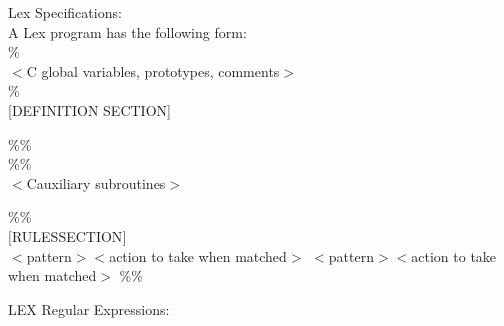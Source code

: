 \documentclass[11pt]{article}
\begin{document}
	\noindent
	Lex Specifications:\\
	A Lex program has the following form:\\
	
	\%{\\
		$<$C global variables, prototypes, comments$>$\\
		\%}\\
	
	[DEFINITION SECTION]
	
	\%\%\\
	
	\%\%\\
	
	$<$Cauxiliary  subroutines$>$
	
	
	\%\%\\
	$[$RULESSECTION$]$\\
	
	$<$pattern$>${$<$action to take when matched$>$}
	$<$pattern$>${$<$action to take when matched$>$}
	\%\%
	
	LEX Regular Expressions:\\
	
\end{document}
